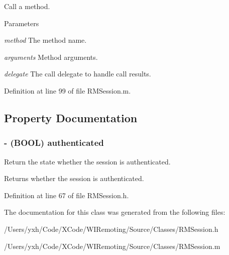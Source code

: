 Call a method. 
\begin{DoxyParams}{Parameters}
\item[{\em method}]The method name. \item[{\em arguments}]Method arguments. \item[{\em delegate}]The call delegate to handle call results. \end{DoxyParams}


Definition at line 99 of file RMSession.m.

\subsection{Property Documentation}
\hypertarget{interface_r_m_session_a71acbe4da4033e724b01e44d39ea2f24}{
\subsubsection[{authenticated}]{\setlength{\rightskip}{0pt plus 5cm}-\/ (BOOL) authenticated}}
\label{interface_r_m_session_a71acbe4da4033e724b01e44d39ea2f24}


Return the state whether the session is authenticated. \begin{DoxyReturn}{Returns}
whether the session is authenticated. 
\end{DoxyReturn}


Definition at line 67 of file RMSession.h.

The documentation for this class was generated from the following files:\begin{DoxyCompactItemize}
\item 
/Users/yxh/Code/XCode/WIRemoting/Source/Classes/RMSession.h\item 
/Users/yxh/Code/XCode/WIRemoting/Source/Classes/RMSession.m\end{DoxyCompactItemize}
